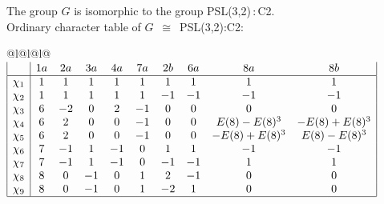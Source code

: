 \documentclass[varwidth=\maxdimen,border=10]{standalone}
\begin{document}
The group $G$ is isomorphic to the group PSL(3,2)\,:\,C2.\\
Ordinary character table of $G$\ $\cong$\ PSL(3,2)\;:\;C2:\\
\begin{center}
\begin{tabular}{@{}l@{}l@{}l@{}}
\hline
\(\begin{array}{|l|ccccccccc|}
  & 1a & 2a & 3a & 4a & 7a & 2b & 6a & 8a & 8b\\ \hline
\chi_{1} & 1 & 1 & 1 & 1 & 1 & 1 & 1 & 1 & 1\\
\chi_{2} & 1 & 1 & 1 & 1 & 1 & -1 & -1 & -1 & -1\\
\chi_{3} & 6 & -2 & 0 & 2 & -1 & 0 & 0 & 0 & 0\\
\chi_{4} & 6 & 2 & 0 & 0 & -1 & 0 & 0 & E(8)-E(8)^{3} & -E(8)+E(8)^{3}\\
\chi_{5} & 6 & 2 & 0 & 0 & -1 & 0 & 0 & -E(8)+E(8)^{3} & E(8)-E(8)^{3}\\
\chi_{6} & 7 & -1 & 1 & -1 & 0 & 1 & 1 & -1 & -1\\
\chi_{7} & 7 & -1 & 1 & -1 & 0 & -1 & -1 & 1 & 1\\
\chi_{8} & 8 & 0 & -1 & 0 & 1 & 2 & -1 & 0 & 0\\
\chi_{9} & 8 & 0 & -1 & 0 & 1 & -2 & 1 & 0 & 0\\
\hline
\end{array}\)\\
\end{tabular}
\end{center}
\end{document}
